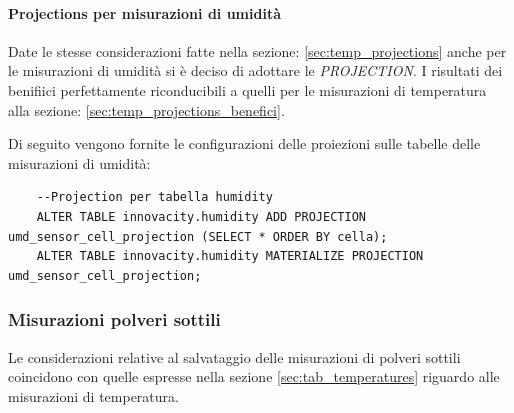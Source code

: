 \paragraph{Projections per misurazioni di umidità} 
Date le stesse considerazioni fatte nella sezione: \ref{sec:temp_projections} anche per le misurazioni di umidità si è deciso di adottare le \textit{PROJECTION}.
I risultati dei benifiici perfettamente riconducibili a quelli per le misurazioni di temperatura alla sezione: \ref{sec:temp_projections_benefici}.

Di seguito vengono fornite le configurazioni delle proiezioni sulle tabelle delle misurazioni di umidità:

\begin{lstlisting}
    --Projection per tabella humidity
    ALTER TABLE innovacity.humidity ADD PROJECTION umd_sensor_cell_projection (SELECT * ORDER BY cella);
    ALTER TABLE innovacity.humidity MATERIALIZE PROJECTION umd_sensor_cell_projection;
\end{lstlisting}


\subsubsection{Misurazioni polveri sottili}Le considerazioni relative al salvataggio delle misurazioni di polveri sottili coincidono con quelle espresse nella sezione \ref{sec:tab_temperatures} riguardo alle misurazioni di temperatura.


